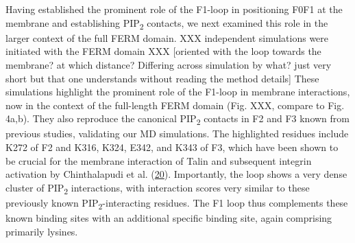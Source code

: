 \documentclass[
  twocolumn]{biophys-new-mod}
\begin{document}
Having established the prominent role of the F1-loop in positioning F0F1 at the membrane and establishing PIP\textsubscript{2} contacts, we next examined this role in the larger context of the full FERM domain. XXX independent simulations were initiated with the FERM domain XXX [oriented with the loop towards the membrane? at which distance? Differing across simulation by what? just very short but that one understands without reading the method details]
These simulations highlight the prominent role of the F1-loop in membrane interactions, now in the context of the full-length FERM domain (Fig. XXX, compare to Fig. 4a,b). They also reproduce the canonical PIP\textsubscript{2} contacts in F2 and F3 known from previous studies, validating our MD simulations. The
highlighted residues include K272 of F2 and K316, K324, E342, and K343
of F3, which have been shown to be crucial for the membrane interaction
of Talin and subsequent integrin activation by Chinthalapudi et al.
(\protect\hyperlink{ref-chinthalapudiInteractionTalinCell2018a}{20}).
Importantly, the loop shows a very dense cluster of PIP\textsubscript{2} interactions, with interaction scores very similar to these previously known PIP\textsubscript{2}-interacting residues. 
The F1 loop thus complements these known binding sites with an
additional specific binding site, again comprising primarily lysines.
\end{document}
